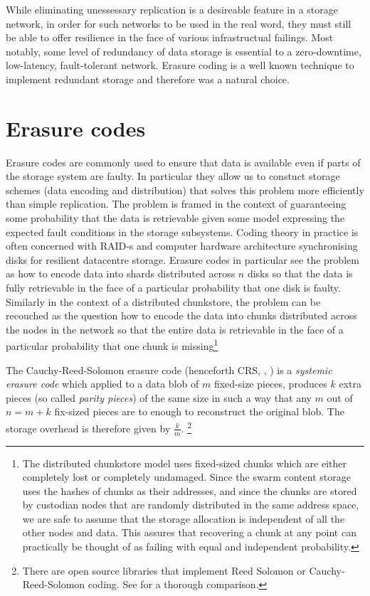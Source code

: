 \documentclass[12pt]{article}
\begin{document}
While eliminating unessessary replication is a desireable feature in a storage network, in order for such networks to be used in the real word, they must still be able to offer resilience in the face of various infrastructual failings. Most notably, some level of redundancy of data storage is essential to a zero-downtime, low-latency, fault-tolerant network. Erasure coding is a well known technique to implement redundant storage and therefore was a natural choice.

\section{Erasure codes}

Erasure codes are commonly used to ensure that data is available even if parts of the storage system are faulty. In particular they allow us to constuct storage schemes (data encoding and distribution) that solves this problem more efficiently than simple replication.  The problem is framed in the context of guaranteeing some probability that the data is retrievable given some model expressing the expected fault conditions in the storage subsystems.
Coding theory in practice is often concerned with RAID-s and computer hardware architecture synchronising disks for resilient datacentre storage.
Erasure codes in particular see the problem as how to encode data into shards distributed across $n$ disks so that the data is fully retrievable in the face of a particular probability that one disk is faulty.
Similarly in the context of a distributed chunkstore, the problem can be recouched as the question how to encode the data into chunks distributed across the nodes in the network so that the entire data is retrievable in the face of a particular probability that one chunk is missing\footnote{The distributed chunkstore model uses fixed-sized chunks which are either completely lost or completely undamaged. Since the swarm content storage uses the hashes of chunks as their addresses, and since the chunks are stored by custodian nodes that are randomly distributed in the same address space, we are safe to assume that the storage allocation is independent of all the other nodes and data. This assures that recovering a chunk at any point can practically be thought of as failing with equal and independent probability.}


The Cauchy-Reed-Solomon erasure code (henceforth CRS, \cite{lubyetal1995CRS}, \cite{plank2006optimizing}) is a \emph{systemic erasure code} which applied to a data blob of $m$ fixed-size pieces, produces $k$ extra pieces (so called \emph{parity pieces}) of the same size in such a way that any $m$ out of $n=m+k$ fix-sized pieces are to enough to reconstruct the original blob. The storage overhead is therefore given by $\frac{k}{m}$.%
%
\footnote{%
There are open source libraries that implement Reed Solomon or Cauchy-Reed-Solomon coding. See \cite{plank2009performance} for a thorough comparison.}
\end{document}
